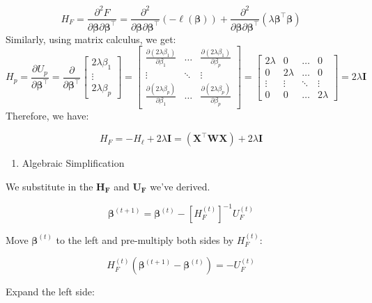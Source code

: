 \documentclass[12pt,halfline,a4paper,]{ouparticle}
\providecommand{\tightlist}{%
  \setlength{\itemsep}{0pt}\setlength{\parskip}{0pt}}
\begin{document}
\[H_F = \frac{\partial^2 F}{\partial \boldsymbol{\beta} \partial \boldsymbol{\beta}^\top} = \frac{\partial^2}{\partial \boldsymbol{\beta} \partial \boldsymbol{\beta}^\top}(-\ell(\boldsymbol{\beta})) + \frac{\partial^2}{\partial \boldsymbol{\beta} \partial \boldsymbol{\beta}^\top}(\lambda \boldsymbol{\beta}^\top \boldsymbol{\beta})\]
Similarly, using matrix calculus, we get: \[
  H_p = \frac{\partial U_p}{\partial \boldsymbol{\beta}^\top} =
  \frac{\partial}{\partial \boldsymbol{\beta}^\top}
  \begin{bmatrix}
  2\lambda\beta_1 \\
  \vdots \\
  2\lambda\beta_p
  \end{bmatrix}
  =
  \begin{bmatrix}
  \frac{\partial (2\lambda\beta_1)}{\partial \beta_1} & \dots & \frac{\partial (2\lambda\beta_1)}{\partial \beta_p} \\
  \vdots & \ddots & \vdots \\
  \frac{\partial (2\lambda\beta_p)}{\partial \beta_1} & \dots & \frac{\partial (2\lambda\beta_p)}{\partial \beta_p}
  \end{bmatrix}
  =
  \begin{bmatrix}
  2\lambda & 0 & \dots & 0 \\
  0 & 2\lambda & \dots & 0 \\
  \vdots & \vdots & \ddots & \vdots \\
  0 & 0 & \dots & 2\lambda
  \end{bmatrix}
  = 2\lambda\mathbf{I}
\] Therefore, we have:

\[H_F = -H_{\ell} + 2\lambda\mathbf{I} = (\mathbf{X}^\top \mathbf{W} \mathbf{X}) + 2\lambda\mathbf{I}\]

\begin{enumerate}
\def\labelenumi{\arabic{enumi}.}
\setcounter{enumi}{3}
\tightlist
\item
  Algebraic Simplification
\end{enumerate}

We substitute in the \(\mathbf{H_F}\) and \(\mathbf{U_F}\) we've
derived.

\[\boldsymbol{\beta}^{(t+1)} = \boldsymbol{\beta}^{(t)} - [H_F^{(t)}]^{-1} U_F^{(t)}\]

Move \(\boldsymbol{\beta}^{(t)}\) to the left and pre-multiply both
sides by \(H_F^{(t)}\):

\[H_F^{(t)} (\boldsymbol{\beta}^{(t+1)} - \boldsymbol{\beta}^{(t)}) = - U_F^{(t)}\]

Expand the left side:
\end{document}
